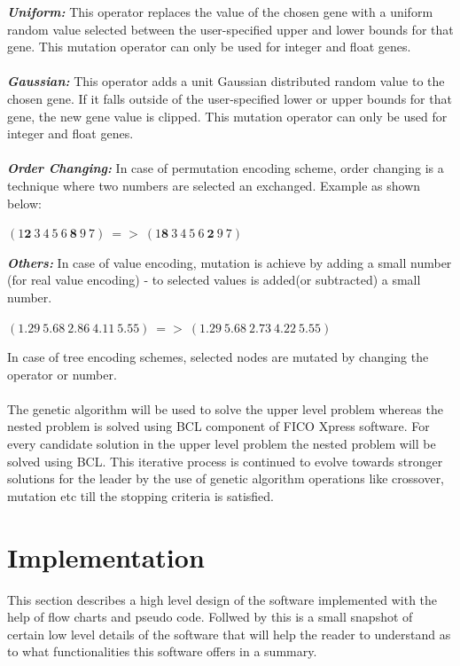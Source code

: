 \documentclass[a4paper, 12pt]{article}
\begin{document}
\textbf{\textit{Uniform: }}
This operator replaces the value of the chosen gene with a uniform random value selected between the user-specified upper and lower bounds for that gene. This mutation operator can only be used for integer and float genes.\\~\\
\textbf{\textit{Gaussian: }}
This operator adds a unit Gaussian distributed random value to the chosen gene. If it falls outside of the user-specified lower or upper bounds for that gene, the new gene value is clipped. This mutation operator can only be used for integer and float genes.\\~\\
\textbf{\textit{Order Changing: }}
In case of permutation encoding scheme, order changing is a technique where two numbers are selected an exchanged. Example as shown below:
\begin{center}
$\left(1 \mathbf{2}\ 3\ 4\ 5\ 6\ \mathbf{8}\ 9\ 7\right)\ =>\ \left(1 \mathbf{8}\ 3\ 4\ 5\ 6\ \mathbf{2}\ 9\ 7\right)$
\end{center}
\textbf{\textit{Others: }}
In case of value encoding, mutation is achieve by adding a small number (for real value encoding) - to selected values is added(or subtracted)
a small number.\\
\begin{center}
$(1.29\ 5.68\ 2.86\ 4.11\ 5.55)\ =>\ (1.29\ 5.68\ 2.73\ 4.22\ 5.55)$
\end{center}
In case of tree encoding schemes, selected nodes are mutated by changing the operator or number.\\~\\
The genetic algorithm will be used to solve the upper level problem whereas the nested problem is solved using BCL component of FICO Xpress software. For every candidate solution in the upper level problem the nested problem will be solved using BCL. This iterative process is continued to evolve towards stronger solutions for the leader by the use of genetic algorithm operations like crossover, mutation etc till the stopping criteria is satisfied.%
\newpage
\section{Implementation}
This section describes a high level design of the software implemented with the help of flow charts and pseudo code. Follwed by this is a small snapshot of certain low level details of the software that will help the reader to understand as to what functionalities this software offers in a summary.
\end{document}
